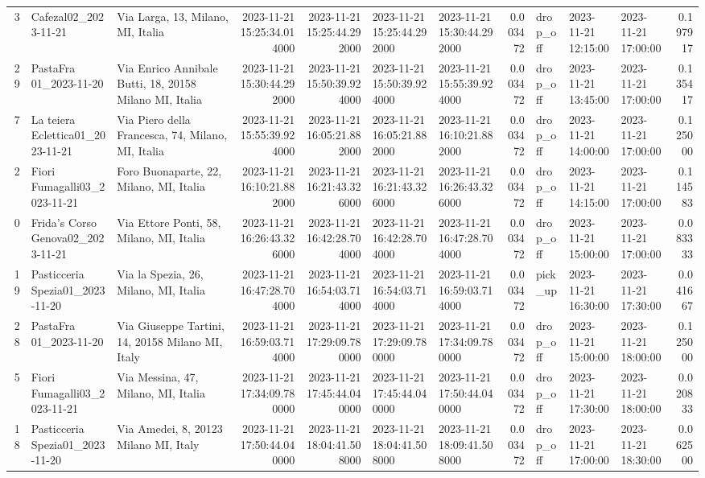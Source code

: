 \documentclass[titlepage]{article}
\begin{document}
\begin{table}[H]
\begin{adjustbox}{max width=\textwidth}
\begin{tabular}{rllrrllrlllr}
3 & Cafezal02\_2023-11-21 & Via Larga, 13, Milano, MI, Italia & 2023-11-21 15:25:34.014000 & 2023-11-21 15:25:44.292000 & 2023-11-21 15:25:44.292000 & 2023-11-21 15:30:44.292000 & 0.003472 & drop\_off & 2023-11-21 12:15:00 & 2023-11-21 17:00:00 & 0.197917 \\
29 & PastaFra 01\_2023-11-20 & Via Enrico Annibale Butti, 18, 20158 Milano MI, Italia & 2023-11-21 15:30:44.292000 & 2023-11-21 15:50:39.924000 & 2023-11-21 15:50:39.924000 & 2023-11-21 15:55:39.924000 & 0.003472 & drop\_off & 2023-11-21 13:45:00 & 2023-11-21 17:00:00 & 0.135417 \\
7 & La teiera Eclettica01\_2023-11-21 & Via Piero della Francesca, 74, Milano, MI, Italia & 2023-11-21 15:55:39.924000 & 2023-11-21 16:05:21.882000 & 2023-11-21 16:05:21.882000 & 2023-11-21 16:10:21.882000 & 0.003472 & drop\_off & 2023-11-21 14:00:00 & 2023-11-21 17:00:00 & 0.125000 \\
2 & Fiori Fumagalli03\_2023-11-21 & Foro Buonaparte, 22, Milano, MI, Italia & 2023-11-21 16:10:21.882000 & 2023-11-21 16:21:43.326000 & 2023-11-21 16:21:43.326000 & 2023-11-21 16:26:43.326000 & 0.003472 & drop\_off & 2023-11-21 14:15:00 & 2023-11-21 17:00:00 & 0.114583 \\
0 & Frida's Corso Genova02\_2023-11-21 & Via Ettore Ponti, 58, Milano, MI, Italia & 2023-11-21 16:26:43.326000 & 2023-11-21 16:42:28.704000 & 2023-11-21 16:42:28.704000 & 2023-11-21 16:47:28.704000 & 0.003472 & drop\_off & 2023-11-21 15:00:00 & 2023-11-21 17:00:00 & 0.083333 \\
19 & Pasticceria Spezia01\_2023-11-20 & Via la Spezia, 26, Milano, MI, Italia & 2023-11-21 16:47:28.704000 & 2023-11-21 16:54:03.714000 & 2023-11-21 16:54:03.714000 & 2023-11-21 16:59:03.714000 & 0.003472 & pick\_up & 2023-11-21 16:30:00 & 2023-11-21 17:30:00 & 0.041667 \\
28 & PastaFra 01\_2023-11-20 & Via Giuseppe Tartini, 14, 20158 Milano MI, Italy & 2023-11-21 16:59:03.714000 & 2023-11-21 17:29:09.780000 & 2023-11-21 17:29:09.780000 & 2023-11-21 17:34:09.780000 & 0.003472 & drop\_off & 2023-11-21 15:00:00 & 2023-11-21 18:00:00 & 0.125000 \\
5 & Fiori Fumagalli03\_2023-11-21 & Via Messina, 47, Milano, MI, Italia & 2023-11-21 17:34:09.780000 & 2023-11-21 17:45:44.040000 & 2023-11-21 17:45:44.040000 & 2023-11-21 17:50:44.040000 & 0.003472 & drop\_off & 2023-11-21 17:30:00 & 2023-11-21 18:00:00 & 0.020833 \\
18 & Pasticceria Spezia01\_2023-11-20 & Via Amedei, 8, 20123 Milano MI, Italy & 2023-11-21 17:50:44.040000 & 2023-11-21 18:04:41.508000 & 2023-11-21 18:04:41.508000 & 2023-11-21 18:09:41.508000 & 0.003472 & drop\_off & 2023-11-21 17:00:00 & 2023-11-21 18:30:00 & 0.062500 \\

\end{tabular}
\end{adjustbox}
\end{table}
\end{document}
